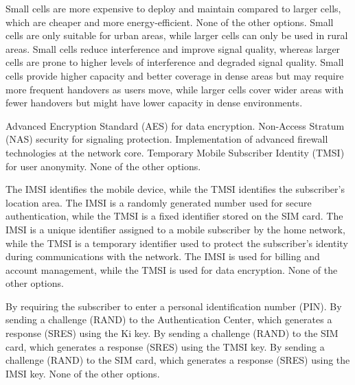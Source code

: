 \begin{checkboxes}
    \choice Small cells are more expensive to deploy and maintain compared to larger cells, which are cheaper and more energy-efficient.
    \choice None of the other options.
    \choice Small cells are only suitable for urban areas, while larger cells can only be used in rural areas.
    \choice Small cells reduce interference and improve signal quality, whereas larger cells are prone to higher levels of interference and degraded signal quality.
    \CorrectChoice Small cells provide higher capacity and better coverage in dense areas but may require more frequent handovers as users move, while larger cells cover wider areas with fewer handovers but might have lower capacity in dense environments.
\end{checkboxes}

\begin{checkboxes}
    \CorrectChoice Advanced Encryption Standard (AES) for data encryption.
    \CorrectChoice Non-Access Stratum (NAS) security for signaling protection.
    \choice Implementation of advanced firewall technologies at the network core.
    \choice Temporary Mobile Subscriber Identity (TMSI) for user anonymity.
    \choice None of the other options.
\end{checkboxes}

\begin{checkboxes}
    \choice The IMSI identifies the mobile device, while the TMSI identifies the subscriber's location area.
    \choice The IMSI is a randomly generated number used for secure authentication, while the TMSI is a fixed identifier stored on the SIM card.
    \CorrectChoice The IMSI is a unique identifier assigned to a mobile subscriber by the home network, while the TMSI is a temporary identifier used to protect the subscriber's identity during communications with the network.
    \choice The IMSI is used for billing and account management, while the TMSI is used for data encryption.
    \choice None of the other options.
\end{checkboxes}

\begin{checkboxes}
    \choice By requiring the subscriber to enter a personal identification number (PIN).
    \choice By sending a challenge (RAND) to the Authentication Center, which generates a response (SRES) using the Ki key.
    \choice By sending a challenge (RAND) to the SIM card, which generates a response (SRES) using the TMSI key.
    \choice By sending a challenge (RAND) to the SIM card, which generates a response (SRES) using the IMSI key.
    \CorrectChoice None of the other options.
\end{checkboxes}

